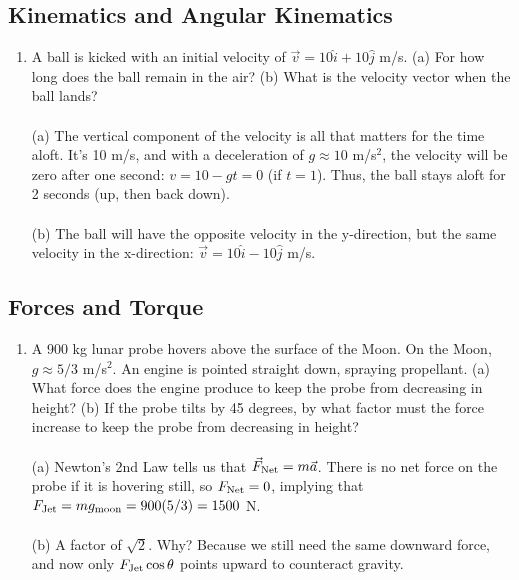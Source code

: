 \documentclass[10pt]{article}
\begin{document}
\subsection{Kinematics and Angular Kinematics}
\begin{enumerate}
\item A ball is kicked with an initial velocity of $\vec{v} = 10\hat{i}+10\hat{j}$ m/s. (a) For how long does the ball remain in the air?  (b) What is the velocity vector when the ball lands? \\ \\
(a) The vertical component of the velocity is all that matters for the time aloft.  It's 10 m/s, and with a deceleration of $g \approx 10$ m/s$^2$, the velocity will be zero after one second: $v = 10-gt = 0$ (if $t=1$).  Thus, the ball stays aloft for 2 seconds (up, then back down). \\ \\
(b) The ball will have the opposite velocity in the y-direction, but the same velocity in the x-direction: $\vec{v} = 10\hat{i}-10\hat{j}$ m/s.
\end{enumerate}
\subsection{Forces and Torque}
\begin{enumerate}
\item A 900 kg lunar probe hovers above the surface of the Moon.  On the Moon, $g \approx 5/3$ m/s$^2$.  An engine is pointed straight down, spraying propellant.  (a) What force does the engine produce to keep the probe from decreasing in height?  (b) If the probe tilts by 45 degrees, by what factor must the force increase to keep the probe from decreasing in height? \\ \\
(a) Newton's 2nd Law tells us that $\vec{F}_{\rm Net} = m\vec{a}$.  There is no net force on the probe if it is hovering still, so $F_{\rm Net} = 0$, implying that $F_{\rm Jet} = mg_{\rm moon} = 900(5/3) = 1500$ N. \\ \\
(b) A factor of $\sqrt{2}$.  Why?  Because we still need the same downward force, and now only $F_{\rm Jet}\cos\theta$ points upward to counteract gravity.
\end{enumerate}
\end{document}
